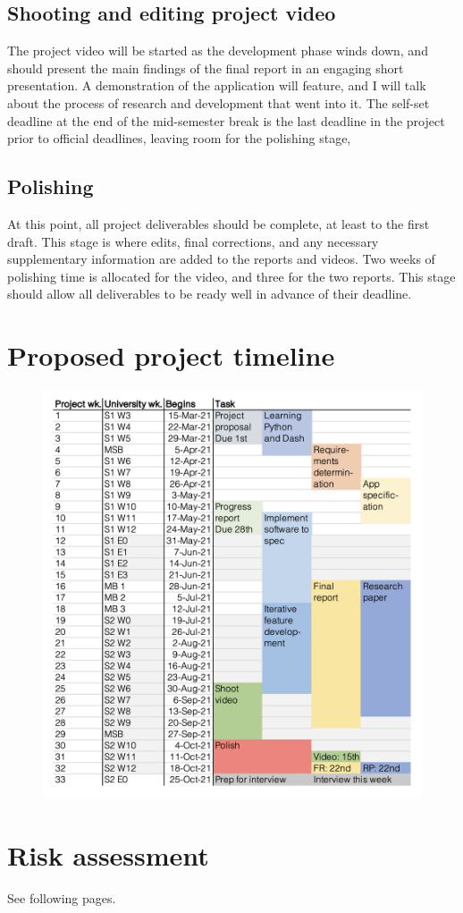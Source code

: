\documentclass[12pt, a4paper]{amsart}
\begin{document}
\subsection{Shooting and editing project video}
The project video will be started as the development phase winds down, and should present the main findings of the final report in an engaging short presentation. A demonstration of the application will feature, and I will talk about the process of research and development that went into it. The self-set deadline at the end of the mid-semester break is the last deadline in the project prior to official deadlines, leaving room for the polishing stage,

\subsection{Polishing}
At this point, all project deliverables should be complete, at least to the first draft. This stage is where edits, final corrections, and any necessary supplementary information are added to the reports and videos. Two weeks of polishing time is allocated for the video, and three for the two reports. This stage should allow all deliverables to be ready well in advance of their deadline. 






\footnotesize{

}

\pagebreak
\appendix

\section{Proposed project timeline}\label{timeline}
\begin{figure}[h]
\includegraphics[width = 16cm]{timeline.png}
\end{figure}

\section{Risk assessment}
See following pages.
\end{document}
